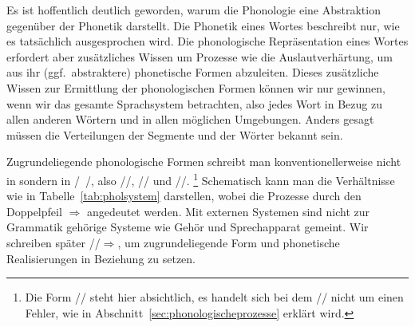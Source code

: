 
Es ist hoffentlich deutlich geworden, warum die Phonologie eine Abstraktion gegenüber der Phonetik darstellt.
Die Phonetik eines Wortes beschreibt nur, wie es tatsächlich ausgesprochen wird.
Die phonologische Repräsentation eines Wortes erfordert aber zusätzliches Wissen um Prozesse wie die Auslautverhärtung, um aus ihr (ggf.\ abstraktere) phonetische Formen abzuleiten.
Dieses zusätzliche Wissen zur Ermittlung der phonologischen Formen können wir nur gewinnen, wenn wir das gesamte Sprachsystem betrachten, also jedes Wort in Bezug zu allen anderen Wörtern und in allen möglichen Umgebungen.
Anders gesagt müssen die Verteilungen der Segmente und der Wörter bekannt sein.

Zugrundeliegende phonologische Formen schreibt man konventionellerweise nicht in \textipa{[~]} sondern in /~/, also \zB //, // und //.%
\footnote{Die Form // steht hier absichtlich, es handelt sich bei dem // nicht um einen Fehler, wie in Abschnitt~\ref{sec:phonologischeprozesse} erklärt wird.}
Schematisch kann man die Verhältnisse wie in Tabelle~\ref{tab:pholsystem} darstellen, wobei die Prozesse durch den Doppelpfeil $\Rightarrow$ angedeutet werden.
Mit externen Systemen sind nicht zur Grammatik gehörige Systeme wie Gehör und Sprechapparat gemeint.
Wir schreiben später //$\Rightarrow$\textipa{[ba:t]}, um zugrundeliegende Form und phonetische Realisierungen in Beziehung zu setzen.

\begin{table}
  \caption{Lexikon, Phonologie und Phonetik}
  \label{tab:pholsystem}
\end{table}

